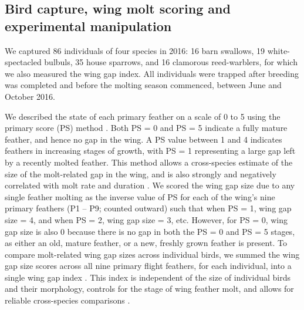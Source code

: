 \begin{refsection}
\subsection{Bird capture, wing molt scoring and experimental manipulation}

We captured 86 individuals of four species in 2016: 16 barn swallows, 19 white-spectacled bulbuls, 35 house sparrows, and 16 clamorous reed-warblers, for which we also measured the wing gap index.
All individuals were trapped after breeding was completed and before the molting season commenced, between June and October 2016.

We described the state of each primary feather on a scale of 0 to 5 using the primary score (PS) method \citep{ginn1983}.
Both PS = 0 and PS = 5 indicate a fully mature feather, and hence no gap in the wing.
A PS value between 1 and 4 indicates feathers in increasing stages of growth, with PS = 1 representing a large gap left by a recently molted feather.
This method allows a cross-species estimate of the size of the molt-related gap in the wing, and is also strongly and negatively correlated with molt rate and duration \citep{rohwer2009}.
We scored the wing gap size due to any single feather molting as the inverse value of PS for each of the wing's nine primary feathers (P1 -- P9; counted outward) such that when PS = 1, wing gap size = 4, and when PS = 2, wing gap size = 3, etc.
However, for PS = 0, wing gap size is also 0 because there is no gap in both the PS = 0 and PS = 5 stages, as either an old, mature feather, or a new, freshly grown feather is present.
To compare molt-related wing gap sizes across individual birds, we summed the wing gap size scores across all nine primary flight feathers, for each individual, into a single wing gap index \citep{kiat2016}.
This index is independent of the size of individual birds and their morphology, controls for the stage of wing feather molt, and allows for reliable cross-species comparisons \citep{bensch1993,kiat2016}.


\end{refsection}
